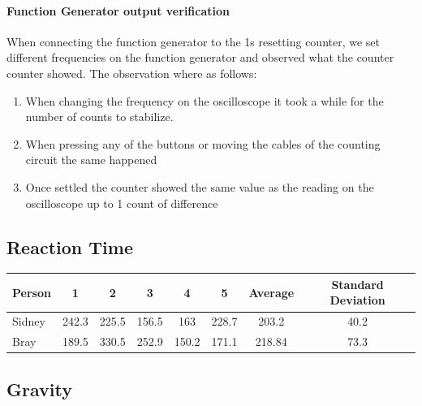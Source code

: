 \documentclass[fleqn,14pt]{article}
\begin{document}
\paragraph{Function Generator output verification}
When connecting the function generator to the 1s resetting counter, we set different frequencies on
the function generator and observed what the counter counter showed. The observation where as follows:

\begin{enumerate}
  \item When changing the frequency on the oscilloscope it took a while for the number of counts to
  stabilize.
  \item When pressing any of the buttons or moving the cables of the counting circuit the same happened
  \item Once settled the counter showed the same value as the reading on the oscilloscope up to 1 count
  of difference
\end{enumerate}

\subsection{Reaction Time}

\vspace{0.5cm}
\begin{tabular}{l|ccccc|cc}
  Person & 1 & 2 & 3 & 4 & 5 & Average & Standard Deviation\\
  \midrule
  Sidney & 242.3 & 225.5 & 156.5 & 163 & 228.7 & 203.2 & 40.2\\
  Bray & 189.5 & 330.5 & 252.9 & 150.2 & 171.1 & 218.84 & 73.3\\
\end{tabular}
\vspace{0.5cm}

\subsection{Gravity}
\end{document}
